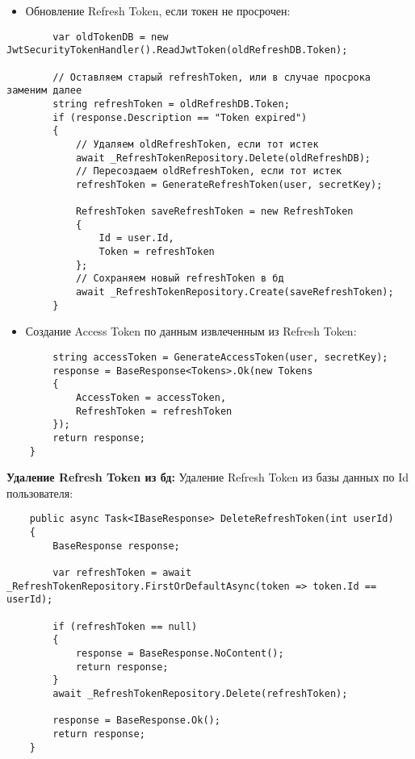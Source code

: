 \begin{itemize}
	\item{Обновление Refresh Token, если токен не просрочен:}
\end{itemize}
\begin{verbatim}
        var oldTokenDB = new JwtSecurityTokenHandler().ReadJwtToken(oldRefreshDB.Token);

        // Оставляем старый refreshToken, или в случае просрока заменим далее
        string refreshToken = oldRefreshDB.Token;
        if (response.Description == "Token expired")
        {
            // Удаляем oldRefreshToken, если тот истек
            await _RefreshTokenRepository.Delete(oldRefreshDB);
            // Пересоздаем oldRefreshToken, если тот истек
            refreshToken = GenerateRefreshToken(user, secretKey);

            RefreshToken saveRefreshToken = new RefreshToken
            {
                Id = user.Id,
                Token = refreshToken
            };
            // Сохраняем новый refreshToken в бд
            await _RefreshTokenRepository.Create(saveRefreshToken);
        }
\end{verbatim}

\begin{itemize}
	\item{Создание Access Token по данным извлеченным из Refresh Token:}
\end{itemize}
\begin{verbatim}
        string accessToken = GenerateAccessToken(user, secretKey);
        response = BaseResponse<Tokens>.Ok(new Tokens
        {
            AccessToken = accessToken,
            RefreshToken = refreshToken
        });
        return response;
    }
\end{verbatim}

\textbf{Удаление Refresh Token из бд:} Удаление Refresh Token из базы данных по Id пользователя:
\begin{verbatim}
    public async Task<IBaseResponse> DeleteRefreshToken(int userId)
    {
        BaseResponse response;

        var refreshToken = await _RefreshTokenRepository.FirstOrDefaultAsync(token => token.Id == userId);

        if (refreshToken == null)
        {
            response = BaseResponse.NoContent();
            return response;
        }
        await _RefreshTokenRepository.Delete(refreshToken);

        response = BaseResponse.Ok();
        return response;
    }
\end{verbatim}

